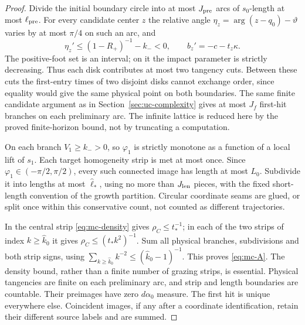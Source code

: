 \begin{proof}
Divide the initial boundary circle into at most $J_{\rm pre}$ arcs of
$s_0$-length at most $\ell_{\rm pre}$. For every candidate center $z$
the relative angle $\eta_z=\arg(z-q_0)-\vartheta$ varies by at most
$\pi/4$ on such an arc, and
\[
 \eta_z'\le(1-R_+)^{-1}-k_-<0,\qquad
 b_z'=-c-t_z\kappa.
\]
The positive-foot set is an interval; on it the impact parameter is
strictly decreasing. Thus each disk contributes at most two tangency
cuts. Between these cuts the first-entry times of two disjoint disks
cannot exchange order, since equality would give the same physical
point on both boundaries. The same finite candidate argument as in
Section~\ref{sec:uc-complexity} gives at most $J_f$ first-hit branches
on each preliminary arc. The infinite lattice is reduced here by the
proved finite-horizon bound, not by truncating a computation.

On each branch $V_1\ge k_->0$, so $\varphi_1$ is strictly monotone as a
function of a local lift of $s_1$. Each target homogeneity strip is met
at most once. Since $\varphi_1\in(-\pi/2,\pi/2)$, every such connected
image has length at most $L_0$. Subdivide it into lengths at most
$\widehat\ell_*$, using no more than $J_{\rm len}$ pieces, with the
fixed short-length convention of the growth partition. Circular
coordinate seams are glued, or split once within this conservative
count, not counted as different trajectories.

In the central strip \eqref{eq:mc-density} gives $\rho_C\le t_*^{-1}$;
in each of the two strips of index $k\ge\widehat k_0$ it gives
$\rho_C\le(t_*k^2)^{-1}$. Sum all physical branches, subdivisions and
both strip signs, using
$\sum_{k\ge\widehat k_0}k^{-2}\le(\widehat k_0-1)^{-1}$.
This proves \eqref{eq:mc-A}. The density bound, rather than a finite
number of grazing strips, is essential. Physical tangencies are finite
on each preliminary arc, and strip and length boundaries are countable.
Their preimages have zero $d\alpha_0$ measure. The first hit is unique
everywhere else. Coincident images, if any after a coordinate
identification, retain their different source labels and are summed.
\end{proof}


